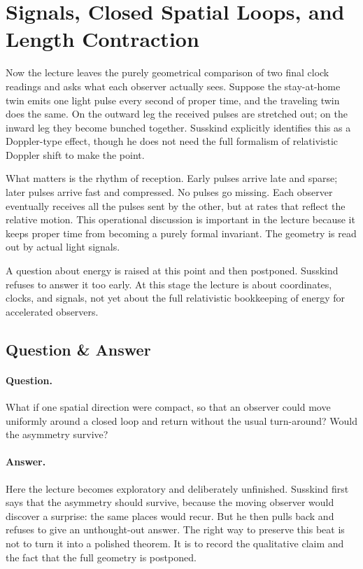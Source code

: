 \section{Signals, Closed Spatial Loops, and Length Contraction}

Now the lecture leaves the purely geometrical comparison of two final clock readings and asks what each observer actually sees. Suppose the stay-at-home twin emits one light pulse every second of proper time, and the traveling twin does the same. On the outward leg the received pulses are stretched out; on the inward leg they become bunched together. Susskind explicitly identifies this as a Doppler-type effect, though he does not need the full formalism of relativistic Doppler shift to make the point.

What matters is the rhythm of reception. Early pulses arrive late and sparse; later pulses arrive fast and compressed. No pulses go missing. Each observer eventually receives all the pulses sent by the other, but at rates that reflect the relative motion. This operational discussion is important in the lecture because it keeps proper time from becoming a purely formal invariant. The geometry is read out by actual light signals.

A question about energy is raised at this point and then postponed. Susskind refuses to answer it too early. At this stage the lecture is about coordinates, clocks, and signals, not yet about the full relativistic bookkeeping of energy for accelerated observers.

\subsection{Question \& Answer}

\paragraph{Question.} What if one spatial direction were compact, so that an observer could move uniformly around a closed loop and return without the usual turn-around? Would the asymmetry survive?

\paragraph{Answer.} Here the lecture becomes exploratory and deliberately unfinished. Susskind first says that the asymmetry should survive, because the moving observer would discover a surprise: the same places would recur. But he then pulls back and refuses to give an unthought-out answer. The right way to preserve this beat is not to turn it into a polished theorem. It is to record the qualitative claim and the fact that the full geometry is postponed.

